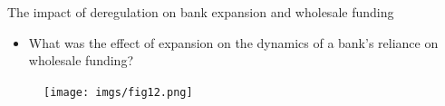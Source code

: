 \documentclass[notes,10pt, aspectratio=169]{beamer}
\begin{document}
\begin{frame}{The impact of deregulation on bank expansion and wholesale funding}\label{der_impac2}
    \begin{itemize}
        \item What was the effect of expansion on the dynamics of a bank’s reliance on wholesale funding? %
         \end{itemize}



    \begin{figure}
        \centering
        \texttt{[image: imgs/fig12.png]}
        \label{fig:my_label}
    \end{figure}
    
    \end{frame}
\end{document}
